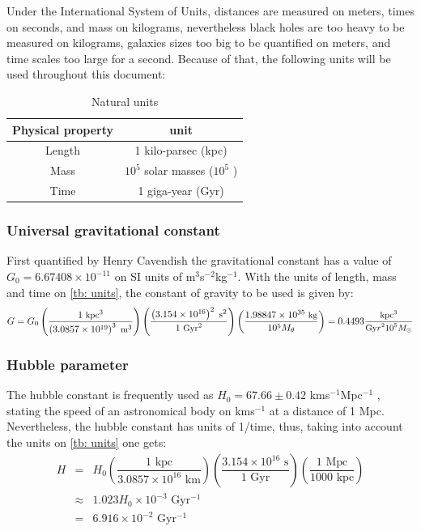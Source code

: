 		Under the International System of Units, distances are measured on meters, times on seconds, and mass on kilograms, nevertheless black holes are too heavy to be measured on kilograms, galaxies sizes too big to be quantified on meters, and time scales too large for a second. Because of that, the following units will be used throughout this document:
		\begin{table}[h]
			\centering
			\caption{Natural units}
			\label{tb: units}
			\begin{tabular}{c|c}
				\hline
				\textbf{Physical property} & \textbf{unit} \\
				\hline
				Length & 1 kilo-parsec (kpc) \\
				Mass & $10^5$ solar masses ($10^5$ \sm) \\
				Time & 1 giga-year (Gyr) \\
				\hline
			\end{tabular}
		\end{table}		
		
		\subsubsection{Universal gravitational constant}
			First quantified by Henry Cavendish the gravitational constant has a value of $G_0 = 6.67408\times10^{-11}$ on SI units of m$^3$s$^{-2}$kg$^{-1}$. With the units of length, mass and time on \autoref{tb: units}, the constant of gravity to be used is given by:
			\begin{equation}
				\small
				G = G_0 \left(\dfrac{1 \text{ kpc}^3}{\left(3.0857\times10^{19}\right)^3  \text{ m}^3}\right)\left(\dfrac{\left(3.154\times10^{16}\right)^2 \text{ s}^2}{1 \text{ Gyr}^2}\right)\left(\dfrac{1.98847\times10^{35} \text{ kg}}{10^5 M_\theta}\right) = 0.4493 \dfrac{\text{kpc$^3$}}{\text{Gy$r^210^5$$M_\odot$}}
			\end{equation}
			
		\subsubsection{Hubble parameter}
		The hubble constant is frequently used as $H_0 = 67.66 \pm 0.42$ kms$^{-1}$Mpc$^{-1}$ \cite{aghanim2018planck}, stating the speed of an astronomical body on kms$^{-1}$ at a distance of 1 Mpc. Nevertheless, the hubble constant has units of 1/time, thus, taking into account the units on \autoref{tb: units} one gets:
		\begin{equation}
			\begin{array}{ccl}
				H & = & H_0 \left(\dfrac{1 \text{ kpc}}{3.0857\times10^{16} \text{ km}}\right)\left(\dfrac{3.154\times10^{16} \text{ s}}{1 \text{ Gyr}}\right)\left(\dfrac{1 \text{ Mpc}}{1000 \text{ kpc}}\right) \\
				& \approx & 1.023 H_0 \times10^{-3} \text{ Gyr$^{-1}$} \\ 
				& = & 6.916\times10^{-2}\text{ Gyr$^{-1}$}
			\end{array}
		\end{equation}
		
